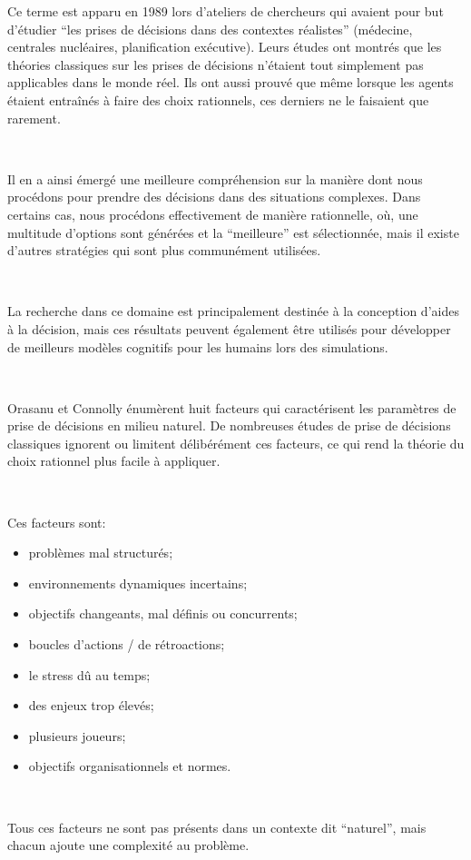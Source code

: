 Ce terme est apparu en 1989 lors d’ateliers de chercheurs qui avaient pour but d’étudier 
“les prises de décisions dans des contextes réalistes” (médecine, centrales nucléaires, planification exécutive). Leurs études ont montrés que les théories classiques sur les prises de décisions n’étaient tout simplement pas applicables dans le monde réel. Ils ont aussi prouvé que même lorsque les agents étaient entraînés à faire des choix rationnels, ces derniers ne le faisaient que rarement.

~\par
Il en a ainsi émergé une meilleure compréhension sur la manière dont nous procédons pour prendre des décisions dans des situations complexes. Dans certains cas, nous procédons effectivement de manière rationnelle, où, une multitude d’options sont générées et la “meilleure” est sélectionnée, mais il existe d’autres stratégies qui sont plus communément utilisées.

~\par
La recherche dans ce domaine est principalement destinée à la conception d’aides à la décision, mais ces résultats peuvent également être utilisés pour développer de meilleurs modèles cognitifs pour les humains lors des simulations.

~\par
Orasanu et Connolly \parencite{orasanu1993reinvention} énumèrent huit facteurs qui caractérisent les paramètres de prise de décisions en milieu naturel. De nombreuses études de prise de décisions classiques ignorent ou limitent délibérément ces facteurs, ce qui rend la théorie du choix rationnel plus facile à appliquer.

~\par

Ces facteurs sont:
\begin{itemize}
\item problèmes mal structurés;
\item environnements dynamiques incertains;
\item objectifs changeants, mal définis ou concurrents;
\item boucles d'actions / de rétroactions;
\item le stress dû au temps;
\item des enjeux trop élevés;
\item plusieurs joueurs;
\item objectifs organisationnels et normes.
\end{itemize}

~\par
Tous ces facteurs ne sont pas présents dans un contexte dit “naturel”, mais chacun ajoute une complexité au problème.



